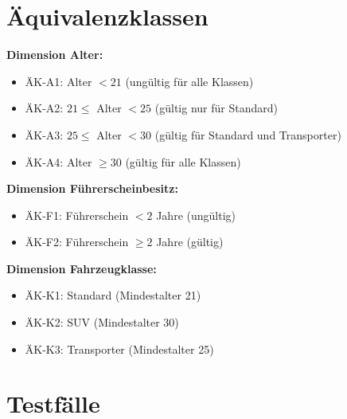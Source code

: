 \documentclass[
	fontsize=12pt,          %
	paper=a4,               %
	numbers=noenddot,       %
	listof=totoc,           %
	listof=entryprefix,     %
	listof=nochaptergap,    %
	bibliography=totoc,     %
	parskip=half,           %
	openany                 %
]{scrbook}
\begin{document}
\section*{Äquivalenzklassen}

\textbf{Dimension Alter:}
\begin{itemize}
	\item ÄK-A1: Alter $< 21$ (ungültig für alle Klassen)
	\item ÄK-A2: $21 \leq$ Alter $< 25$ (gültig nur für Standard)
	\item ÄK-A3: $25 \leq$ Alter $< 30$ (gültig für Standard und Transporter)
	\item ÄK-A4: Alter $\geq 30$ (gültig für alle Klassen)
\end{itemize}

\textbf{Dimension Führerscheinbesitz:}
\begin{itemize}
	\item ÄK-F1: Führerschein $< 2$ Jahre (ungültig)
	\item ÄK-F2: Führerschein $\geq 2$ Jahre (gültig)
\end{itemize}

\textbf{Dimension Fahrzeugklasse:}
\begin{itemize}
	\item ÄK-K1: Standard (Mindestalter 21)
	\item ÄK-K2: SUV (Mindestalter 30)
	\item ÄK-K3: Transporter (Mindestalter 25)
\end{itemize}

\section*{Testfälle}
\end{document}
